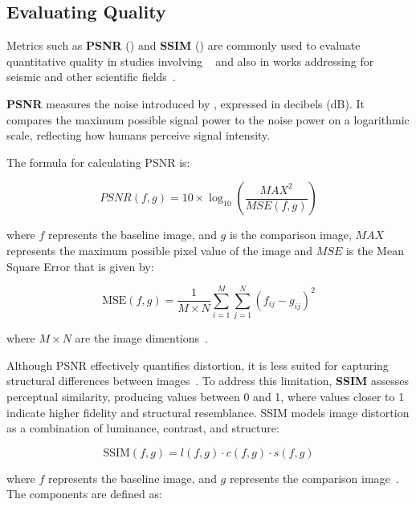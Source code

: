 \documentclass[Ingles]{ic-tese-v3}
\begin{document}
\subsection{Evaluating Quality}
\label{sec:eval_qual}

Metrics such as \textbf{PSNR} () and \textbf{SSIM} () are commonly used to evaluate quantitative quality in studies involving \compression~\cite{cuszp, fz} and also in works addressing \compression for seismic and other scientific fields~\cite{kukreja2020, boehm2016, wang2023}.

\textbf{PSNR} measures the noise introduced by \compression, expressed in decibels (dB). It compares the maximum possible signal power to the noise power on a logarithmic scale, reflecting how humans perceive signal intensity.

The formula for calculating PSNR is:

\begin{equation}
PSNR(f,g) = 10 \times \log_{10}\left(\frac{MAX^2}{MSE(f,g)}\right)
\label{eq:psnr}
\end{equation}

where $f$ represents the baseline image, and $g$ is the comparison image, $MAX$ represents the maximum possible pixel value of the image and $MSE$ is the Mean Square Error that is given by:

\begin{equation}
\text{MSE}(f, g) = \frac{1}{M \times N} \sum_{i=1}^{M} \sum_{j=1}^{N} \left(f_{ij} - g_{ij}\right)^2
\label{eq:mse}
\end{equation}

where $M \times N$ are the image dimentions~\cite{hore2010}.

Although PSNR effectively quantifies distortion, it is less suited for capturing structural differences between images~\cite{hore2010}. To address this limitation, \textbf{SSIM} assesses perceptual similarity, producing values between 0 and 1, where values closer to 1 indicate higher fidelity and structural resemblance. SSIM models image distortion as a combination of luminance, contrast, and structure:

\begin{equation}
\text{SSIM}(f, g) = l(f, g) \cdot c(f, g) \cdot s(f, g)
\label{eq:ssim}
\end{equation}

where $f$ represents the baseline image, and $g$ represents the comparison image~\cite{hore2010}. The components are defined as:
\end{document}
